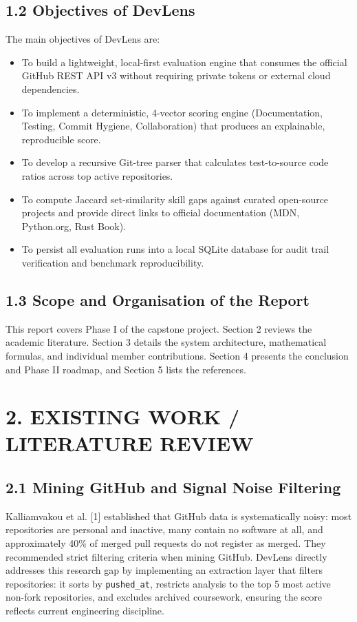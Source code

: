 \documentclass[12pt,a4paper]{article}
\begin{document}
\subsection{1.2 Objectives of DevLens}
The main objectives of DevLens are:
\begin{itemize}
    \item To build a lightweight, local-first evaluation engine that consumes the official GitHub REST API v3 without requiring private tokens or external cloud dependencies.
    \item To implement a deterministic, 4-vector scoring engine (Documentation, Testing, Commit Hygiene, Collaboration) that produces an explainable, reproducible score.
    \item To develop a recursive Git-tree parser that calculates test-to-source code ratios across top active repositories.
    \item To compute Jaccard set-similarity skill gaps against curated open-source projects and provide direct links to official documentation (MDN, Python.org, Rust Book).
    \item To persist all evaluation runs into a local SQLite database for audit trail verification and benchmark reproducibility.
\end{itemize}

\subsection{1.3 Scope and Organisation of the Report}
This report covers Phase I of the capstone project. Section 2 reviews the academic literature. Section 3 details the system architecture, mathematical formulas, and individual member contributions. Section 4 presents the conclusion and Phase II roadmap, and Section 5 lists the references.

\newpage
\thispagestyle{fancy}
\section{2. EXISTING WORK / LITERATURE REVIEW}

\subsection{2.1 Mining GitHub and Signal Noise Filtering}
Kalliamvakou et al. [1] established that GitHub data is systematically noisy: most repositories are personal and inactive, many contain no software at all, and approximately 40\% of merged pull requests do not register as merged. They recommended strict filtering criteria when mining GitHub. DevLens directly addresses this research gap by implementing an extraction layer that filters repositories: it sorts by \texttt{pushed\_at}, restricts analysis to the top 5 most active non-fork repositories, and excludes archived coursework, ensuring the score reflects current engineering discipline.
\end{document}

